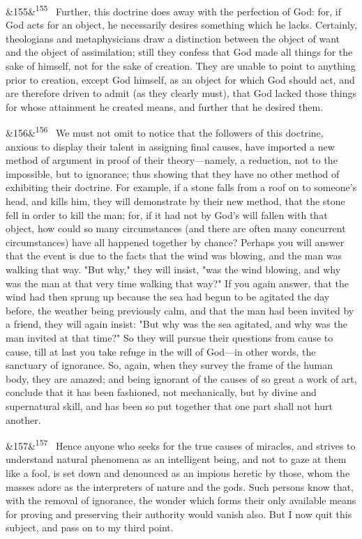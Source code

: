 \documentclass[12pt]{article}
\newcommand{\para}[1][]{\par\noindent\ifx&#1&\else\textsuperscript{\footnotesize #1}~\fi}
\begin{document}
\para[155] Further, this doctrine does away with the perfection of God: for, if God acts for an object, he necessarily desires something which he lacks. Certainly, theologians and metaphysicians draw a distinction between the object of want and the object of assimilation; still they confess that God made all things for the sake of himself, not for the sake of creation. They are unable to point to anything prior to creation, except God himself, as an object for which God should act, and are therefore driven to admit (as they clearly must), that God lacked those things for whose attainment he created means, and further that he desired them.

\para[156] We must not omit to notice that the followers of this doctrine, anxious to display their talent in assigning final causes, have imported a new method of argument in proof of their theory---namely, a reduction, not to the impossible, but to ignorance; thus showing that they have no other method of exhibiting their doctrine. For example, if a stone falls from a roof on to someone's head, and kills him, they will demonstrate by their new method, that the stone fell in order to kill the man; for, if it had not by God's will fallen with that object, how could so many circumstances (and there are often many concurrent circumstances) have all happened together by chance? Perhaps you will answer that the event is due to the facts that the wind was blowing, and the man was walking that way. "But why," they will insist, "was the wind blowing, and why was the man at that very time walking that way?" If you again answer, that the wind had then sprung up because the sea had begun to be agitated the day before, the weather being previously calm, and that the man had been invited by a friend, they will again insist: "But why was the sea agitated, and why was the man invited at that time?" So they will pursue their questions from cause to cause, till at last you take refuge in the will of God---in other words, the sanctuary of ignorance. So, again, when they survey the frame of the human body, they are amazed; and being ignorant of the causes of so great a work of art, conclude that it has been fashioned, not mechanically, but by divine and supernatural skill, and has been so put together that one part shall not hurt another.

\para[157] Hence anyone who seeks for the true causes of miracles, and strives to understand natural phenomena as an intelligent being, and not to gaze at them like a fool, is set down and denounced as an impious heretic by those, whom the masses adore as the interpreters of nature and the gods. Such persons know that, with the removal of ignorance, the wonder which forms their only available means for proving and preserving their authority would vanish also. But I now quit this subject, and pass on to my third point.
\end{document}
